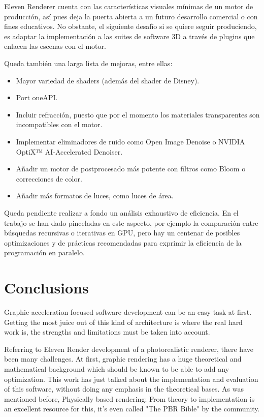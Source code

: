 Eleven Renderer cuenta con las características visuales mínimas de un motor de producción, así pues deja la puerta abierta a un futuro desarrollo comercial o con fines educativos. No obstante, el siguiente desafío si se quiere seguir produciendo, es adaptar la implementación a las suites de software 3D a través de plugins que enlacen las escenas con el motor. 

Queda también una larga lista de mejoras, entre ellas:

\begin{itemize}
	
	\item Mayor variedad de shaders (además del shader de Disney).
	\item Port oneAPI.
	\item Incluir refracción, puesto que por el momento los materiales transparentes son incompatibles con el motor.
	\item Implementar eliminadores de ruido como Open Image Denoise o NVIDIA OptiX™ AI-Accelerated Denoiser.
	\item Añadir un motor de postprocesado más potente con filtros como Bloom o correcciones de color.
	\item Añadir más formatos de luces, como luces de área.
	
\end{itemize}

Queda pendiente realizar a fondo un análisis exhaustivo de eficiencia. En el trabajo se han dado pinceladas en este aspecto, por ejemplo la comparación entre búsquedas recursivas o iterativas en GPU, pero hay un centenar de posibles optimizaciones y de prácticas recomendadas para exprimir la eficiencia de la programación en paralelo.

\chapter*{Conclusions}

Graphic acceleration focused software development can be an easy task at first. Getting the most juice out of this kind of architecture is where the real hard work is, the strengths and limitations must be taken into account.

Referring to Eleven Render development of a photorealistic renderer, there have been many challenges. At first, graphic rendering has a huge theoretical and mathematical background which should be known to be able to add any optimization. This work has just talked about the implementation and evaluation of this software, without doing any emphasis in the theoretical bases. As was mentioned before, Physically based rendering: From theory to implementation \cite{pharr2016physically} is an excellent resource for this, it's even called "The PBR Bible" by the community. 

